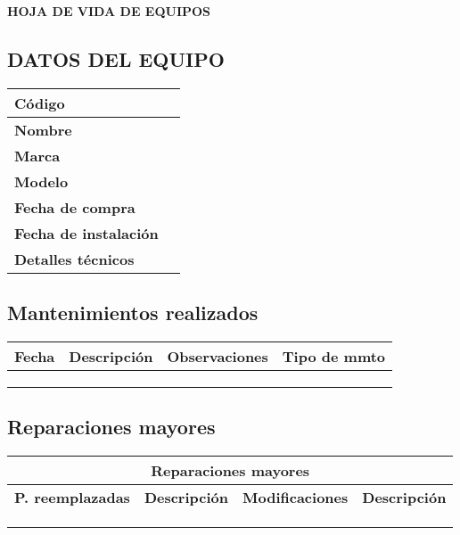 \documentclass[a4paper, 10pt]{article}
\begin{document}
\begin{center}
    \Large\textbf{HOJA DE VIDA DE EQUIPOS}
\end{center}
\subsection*{DATOS DEL EQUIPO}
\noindent %
\begin{tabularx}{\textwidth}{|l|X|}
    \hline
    \textbf{Código} & \\
    \hline
    \textbf{Nombre} & \\
    \hline
    \textbf{Marca} & \\
    \hline
    \textbf{Modelo} & \\
    \hline
    \textbf{Fecha de compra} & \\
    \hline
    \textbf{Fecha de instalación} & \\
    \hline
    \textbf{Detalles técnicos} & \\
    \hline
\end{tabularx}
\subsection*{Mantenimientos realizados}
\noindent
\begin{tabularx}{\textwidth}{|c|X|X|c|}
    \hline
    \textbf{Fecha} & \textbf{Descripción} & \textbf{Observaciones} & \textbf{Tipo de mmto} \\
    \hline
     & & & \\
    \hline
     & & & \\
    \hline
     & & & \\
    \hline
\end{tabularx}
\subsection*{Reparaciones mayores}
\noindent
\begin{tabularx}{\textwidth}{|c|X|c|X|}
    \hline
    \multicolumn{4}{|c|}{\textbf{Reparaciones mayores}} \\
    \hline
    \textbf{P. reemplazadas} & \textbf{Descripción} & \textbf{Modificaciones} & \textbf{Descripción} \\
    \hline
     & & & \\
    \hline
     & & & \\
    \hline
     & & & \\
    \hline
\end{tabularx}
\end{document}
